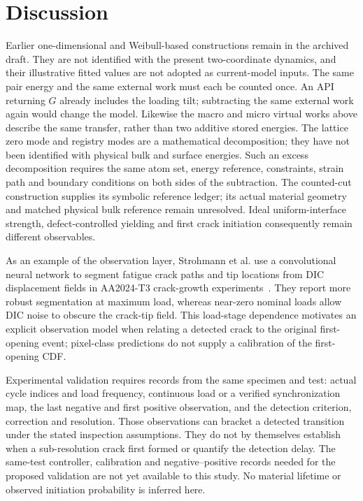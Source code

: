 \documentclass[11pt]{article}
\begin{document}
\section{Discussion}
Earlier one-dimensional and Weibull-based constructions remain in the archived
draft. They are not identified with the present two-coordinate dynamics, and
their illustrative fitted values are not adopted as current-model inputs.
The same pair energy and the same external work must each be counted once.
An API returning $G$ already includes the loading tilt; subtracting the same external work again
would change the model. Likewise the macro and micro virtual works above
describe the same transfer, rather than two additive stored energies.
The lattice zero mode and registry modes are a mathematical decomposition;
they have not been identified with physical bulk and surface energies.
Such an excess decomposition requires the same atom set, energy reference,
constraints, strain path and boundary conditions on both sides of the subtraction.
The counted-cut construction supplies its symbolic reference ledger;
its actual material geometry and matched physical bulk reference remain unresolved.
Ideal uniform-interface strength, defect-controlled yielding and first crack
initiation consequently remain different observables.

As an example of the observation layer, Strohmann et al. use a convolutional
neural network to segment fatigue crack paths and tip locations from DIC
displacement fields in AA2024-T3 crack-growth experiments~\cite{Strohmann2021}.
They report more robust segmentation at maximum load, whereas near-zero
nominal loads allow DIC noise to obscure the crack-tip field. This load-stage
dependence motivates an explicit observation model when relating a detected
crack to the original first-opening event; pixel-class predictions do not
supply a calibration of the first-opening CDF.

Experimental validation requires records from the same specimen and test:
actual cycle indices and load frequency, continuous load or a verified
synchronization map, the last negative and first positive observation,
and the detection criterion, correction and resolution.
Those observations can bracket a detected transition under the stated inspection
assumptions. They do not by themselves establish when a sub-resolution crack
first formed or quantify the detection delay. The same-test controller, calibration and negative--positive records
needed for the proposed validation are not yet available to this study.
No material lifetime or observed initiation probability is inferred here.
\end{document}
